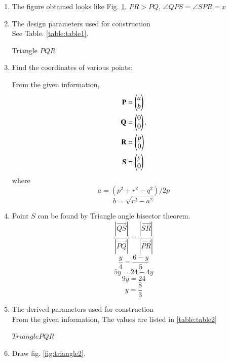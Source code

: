 \renewcommand{\theequation}{\theenumi}
\begin{enumerate}[label=\thesection.\arabic*.,ref=\thesection.\theenumi]

\begin{figure}[!ht]
\centering
\resizebox{\columnwidth}{!}{}
\caption{Quadilateral by Latex-Tikz}
\label{fig:triangle1}	
\end{figure}

\item The figure obtained looks like Fig. \ref{fig:triangle1}.
$PR > PQ$, $\angle{QPS}=\angle{SPR}=x$

\item The design parameters used for construction \\

\solution See Table. \ref{table:table1}.
\begin{table}[ht!]
\centering

\caption{Triangle $PQR$}
\label{table:table1}	
\end{table} 


\item Find the coordinates of various points: 

\solution From the given information, 
\begin{align}
\mathbf{P} &= \begin{pmatrix}a\\b\end{pmatrix}
\label{eq:constr_a} 
\\
 \mathbf{Q} &= \begin{pmatrix}0\\0\end{pmatrix}, 
\label{eq:constr_b}
\\
\mathbf{R} &= \begin{pmatrix}p\\0\end{pmatrix}
\label{eq:constr_c}
\\
\mathbf{S} &= \begin{pmatrix}y\\0\end{pmatrix}
\label{eq:constr_d}
\end{align}
where
$$ a =(p^2+r^2-q^2)/2p $$
$$ b =\sqrt{r^2-a^2} $$

\item Point $S$ can be found by Triangle angle bisector theorem.
$$\frac{|\vec{QS}|}{|\vec{PQ}|} = \frac{|\vec{SR}|}{|\vec{PR}|}$$
$$\frac{y}{4} = \frac{6-y}{5}$$
$$5y = 24 - 4y$$
$$9y = 24$$
$$y = \frac{8}{3}$$

\item The derived parameters used for construction \\

\solution From the given information, 
The values are listed in \ref{table:table2}\\
\begin{table}[ht!]
\centering

\caption{$Triangle PQR$}
\label{table:table2}	
\end{table} 
\item Draw fig. \ref{fig:triangle2}.


\end{enumerate}
